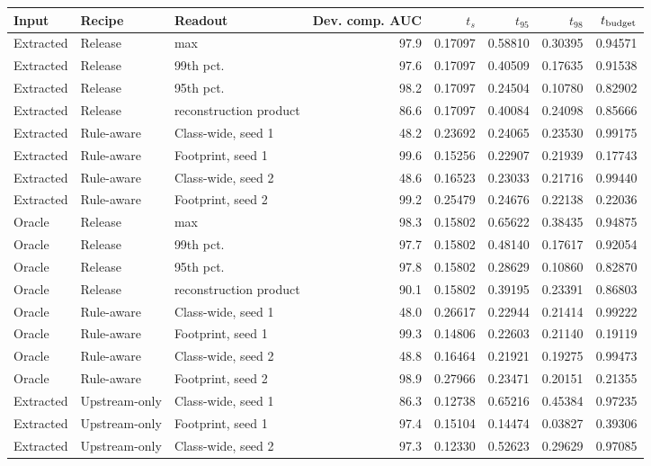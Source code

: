 \begin{tabular}{lllrrrrr}
\toprule
Input & Recipe & Readout & Dev. comp. AUC & $t_s$ & $t_{95}$ & $t_{98}$ & $t_{\rm budget}$ \\
\midrule
Extracted & Release & max & 97.9 & 0.17097 & 0.58810 & 0.30395 & 0.94571 \\
Extracted & Release & 99th pct. & 97.6 & 0.17097 & 0.40509 & 0.17635 & 0.91538 \\
Extracted & Release & 95th pct. & 98.2 & 0.17097 & 0.24504 & 0.10780 & 0.82902 \\
Extracted & Release & reconstruction product & 86.6 & 0.17097 & 0.40084 & 0.24098 & 0.85666 \\
Extracted & Rule-aware & Class-wide, seed 1 & 48.2 & 0.23692 & 0.24065 & 0.23530 & 0.99175 \\
Extracted & Rule-aware & Footprint, seed 1 & 99.6 & 0.15256 & 0.22907 & 0.21939 & 0.17743 \\
Extracted & Rule-aware & Class-wide, seed 2 & 48.6 & 0.16523 & 0.23033 & 0.21716 & 0.99440 \\
Extracted & Rule-aware & Footprint, seed 2 & 99.2 & 0.25479 & 0.24676 & 0.22138 & 0.22036 \\
\midrule
Oracle & Release & max & 98.3 & 0.15802 & 0.65622 & 0.38435 & 0.94875 \\
Oracle & Release & 99th pct. & 97.7 & 0.15802 & 0.48140 & 0.17617 & 0.92054 \\
Oracle & Release & 95th pct. & 97.8 & 0.15802 & 0.28629 & 0.10860 & 0.82870 \\
Oracle & Release & reconstruction product & 90.1 & 0.15802 & 0.39195 & 0.23391 & 0.86803 \\
Oracle & Rule-aware & Class-wide, seed 1 & 48.0 & 0.26617 & 0.22944 & 0.21414 & 0.99222 \\
Oracle & Rule-aware & Footprint, seed 1 & 99.3 & 0.14806 & 0.22603 & 0.21140 & 0.19119 \\
Oracle & Rule-aware & Class-wide, seed 2 & 48.8 & 0.16464 & 0.21921 & 0.19275 & 0.99473 \\
Oracle & Rule-aware & Footprint, seed 2 & 98.9 & 0.27966 & 0.23471 & 0.20151 & 0.21355 \\
\midrule
Extracted & Upstream-only & Class-wide, seed 1 & 86.3 & 0.12738 & 0.65216 & 0.45384 & 0.97235 \\
Extracted & Upstream-only & Footprint, seed 1 & 97.4 & 0.15104 & 0.14474 & 0.03827 & 0.39306 \\
Extracted & Upstream-only & Class-wide, seed 2 & 97.3 & 0.12330 & 0.52623 & 0.29629 & 0.97085 \\

\end{tabular}
